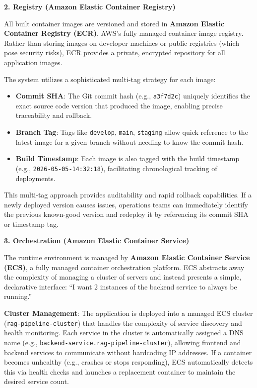 \textbf{2. Registry (Amazon Elastic Container Registry)}

All built container images are versioned and stored in \textbf{Amazon Elastic Container Registry (ECR)}, AWS's fully managed container image registry. Rather than storing images on developer machines or public registries (which pose security risks), ECR provides a private, encrypted repository for all application images.

The system utilizes a sophisticated multi-tag strategy for each image:
\begin{itemize}
    \item \textbf{Commit SHA}: The Git commit hash (e.g., \texttt{a3f7d2c}) uniquely identifies the exact source code version that produced the image, enabling precise traceability and rollback.
    \item \textbf{Branch Tag}: Tags like \texttt{develop}, \texttt{main}, \texttt{staging} allow quick reference to the latest image for a given branch without needing to know the commit hash.
    \item \textbf{Build Timestamp}: Each image is also tagged with the build timestamp (e.g., \texttt{2026-05-05-14:32:18}), facilitating chronological tracking of deployments.
\end{itemize}

This multi-tag approach provides auditability and rapid rollback capabilities. If a newly deployed version causes issues, operations teams can immediately identify the previous known-good version and redeploy it by referencing its commit SHA or timestamp tag.

\textbf{3. Orchestration (Amazon Elastic Container Service)}

The runtime environment is managed by \textbf{Amazon Elastic Container Service (ECS)}, a fully managed container orchestration platform. ECS abstracts away the complexity of managing a cluster of servers and instead presents a simple, declarative interface: ``I want 2 instances of the backend service to always be running.''

\textbf{Cluster Management}: The application is deployed into a managed ECS cluster (\texttt{rag-pipeline-cluster}) that handles the complexity of service discovery and health monitoring. Each service in the cluster is automatically assigned a DNS name (e.g., \texttt{backend-service.rag-pipeline-cluster}), allowing frontend and backend services to communicate without hardcoding IP addresses. If a container becomes unhealthy (e.g., crashes or stops responding), ECS automatically detects this via health checks and launches a replacement container to maintain the desired service count.

